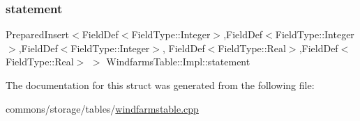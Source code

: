 \mbox{\label{struct_windfarms_table_1_1_impl_a9f5129a6d5b5d8e4ec1e5b904e21ef74}} 
\subsubsection{\texorpdfstring{statement}{statement}}
{\footnotesize\ttfamily Prepared\+Insert$<$Field\+Def$<$Field\+Type\+::\+Integer$>$,Field\+Def$<$Field\+Type\+::\+Integer$>$,Field\+Def$<$Field\+Type\+::\+Integer$>$, Field\+Def$<$Field\+Type\+::\+Real$>$,Field\+Def$<$Field\+Type\+::\+Real$>$ $>$ Windfarms\+Table\+::\+Impl\+::statement}



The documentation for this struct was generated from the following file\+:\begin{DoxyCompactItemize}
\item 
commons/storage/tables/\mbox{\hyperlink{windfarmstable_8cpp}{windfarmstable.\+cpp}}\end{DoxyCompactItemize}
